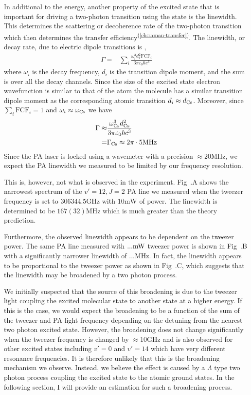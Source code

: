 In additional to the energy, another property of the excited state
that is important for driving a two-photon transition using the state is the linewidth.
This determines the scattering or decoherence rate of
the two-photon transition which then determines
the transfer efficiency\textsuperscript{(\ref{ch:raman-transfer})}.
The linewidth, or decay rate, due to electric dipole transitions is
\cite[p.~197]{bransden_physics_2003},
\begin{align*}
  \Gamma=&\sum_{i}\frac{\omega_i^3d_i^2\mathrm{FCF}_i}{3\pi\varepsilon_0\hbar c^3}
\end{align*}
where $\omega_i$ is the decay frequency, $d_i$ is the transition dipole moment,
and the sum is over all the decay channels.
Since the size of the excited state electron wavefunction is similar to that of the atom
the molecule has a similar transition dipole moment as the corresponding atomic transition
$d_i\approx d_{\mathrm{Cs}}$. Moreover, since $\sum_i\mathrm{FCF}_i=1$ and $\omega_i\approx\omega_{\mathrm{Cs}}$
we have
\begin{align*}
  \Gamma\approx&\frac{\omega_{\mathrm{Cs}}^3d_{\mathrm{Cs}}^2}{3\pi\varepsilon_0\hbar c^3}\\
  =&\Gamma_{\mathrm{Cs}}\approx2\pi\cdot5\mathrm{MHz}
\end{align*}
Since the PA laser is locked using a wavemeter with a precision
$\approx20\mathrm{MHz}$, we expect the PA linewidth we measured to be limited
by our frequency resolution.

This is, however, not what is observed in the experiment.
Fig~.\todo{\ref{}}A shows the narrowest spectrum of the $v'=12, J=2$ PA line
we measured when the tweezer frequency is set to $306344.5 \mathrm{GHz}$
with $10 \mathrm{mW}$ of power. The linewidth is determined to be $167(32) \mathrm{MHz}$
which is much greater than the theory prediction.

Furthermore, the observed linewidth appears to be dependent on the tweezer power.
The same PA line measured with $... \mathrm{mW}$ tweezer power
is shown in Fig~.\todo{\ref{}}B with a significantly narrower linewidth
of $... \mathrm{MHz}$.
In fact, the linewidth appears to be proportional to the tweezer power
as shown in Fig~.\todo{\ref{}}C,
which suggests that the linewidth may be broadened by a two photon process.

We initially suspected that the source of this broadening is due to the tweezer light
coupling the excited molecular state to another state at a higher energy. 
If this is the case, we would expect the broadening to be a function of
the sum of the tweezer and PA light frequency depending on the detuning from the nearest
two photon excited state.
However, the broadening does not change significantly when the tweezer frequency
is changed by $\approx10\mathrm{GHz}$ and
is also observed for other excited states including $v'=0$ and $v'=14$
which have very different resonance frequencies.
It is therefore unlikely that this is the broadening mechanism we observe.
Instead, we believe the effect is caused by a $\Lambda$ type two photon process
coupling the excited state to the atomic ground states.
In the following section, I will provide an estimation for such a broadening process.

